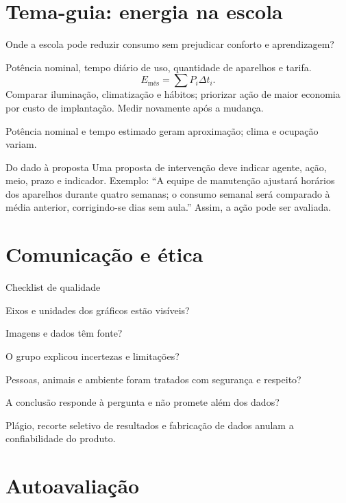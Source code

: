 \documentclass{notaaula}
\begin{document}
\section{Tema-guia: energia na escola}

\begin{exemplo}
 Onde a escola pode reduzir consumo sem prejudicar conforto e aprendizagem?

 Potência nominal, tempo diário de uso, quantidade de aparelhos e tarifa.
\[
  E_{\mathrm{mês}}=\sum P_i\Delta t_i.
\]
 Comparar iluminação, climatização e hábitos; priorizar ação de maior economia
por custo de implantação. Medir novamente após a mudança.

 Potência nominal e tempo estimado geram aproximação; clima e ocupação variam.
\end{exemplo}

\begin{copiar}{Do dado à proposta}
Uma proposta de intervenção deve indicar agente, ação, meio, prazo e indicador. Exemplo:
``A equipe de manutenção ajustará horários dos aparelhos durante quatro semanas; o consumo semanal
será comparado à média anterior, corrigindo-se dias sem aula.'' Assim, a ação pode ser avaliada.
\end{copiar}

\section{Comunicação e ética}

\begin{copiar}{Checklist de qualidade}
\begin{itens}
\item Eixos e unidades dos gráficos estão visíveis?
\item Imagens e dados têm fonte?
\item O grupo explicou incertezas e limitações?
\item Pessoas, animais e ambiente foram tratados com segurança e respeito?
\item A conclusão responde à pergunta e não promete além dos dados?
\end{itens}
Plágio, recorte seletivo de resultados e fabricação de dados anulam a confiabilidade do produto.
\end{copiar}

\section{Autoavaliação}
\end{document}

